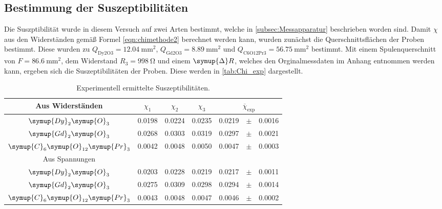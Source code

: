 \subsection{Bestimmung der Suszeptibilitäten}
\label{subsec:A_Suszep}
Die Suszptibilität wurde in diesem Versuch auf zwei Arten bestimmt, welche in \autoref{subsec:Messapparatur} beschrieben worden sind. Damit $\chi$ aus den Widerständen gemäß
Formel \eqref{eqn:chimethode2} berechnet werden kann, wurden zunächst die Querschnittsflächen der Proben bestimmt. Diese wurden zu 
$Q_{\text{Dy2O3}} = \qty{12.04}{\milli\metre\squared}$, $Q_{\text{Gd2O3}} = \qty{8.89}{\milli\metre\squared}$ und $Q_{\text{C6O12Pr3}} = \qty{56.75}{\milli\metre\squared}$
bestimmt. Mit einem Spulenquerschnitt von $F = \qty{86,6}{\milli\metre\squared}$, dem Widerstand $R_3 = \qty{998}{\ohm}$ und einem $\symup{\Delta}R$, welches den Orginalmessdaten 
im Anhang entnommen werden kann, ergeben sich die Suszeptibilitäten der Proben. Diese werden in \autoref{tab:Chi_exp} dargestellt.
\begin{table}
  \centering
  \caption{Experimentell ermittelte Suszeptibilitäten.}
  \label{tab:Chi_exp}
  \begin{tabular}{c S[table-format = 1.4] S S r c l}
    \toprule
      {Aus Widerständen} & {$\chi_1$} & {$\chi_2$} & {$\chi_3$} &
        \\
    \midrule
      {$\symup{Dy}_2\symup{O}_3$}                 & 0.0198 & 0.0224 & 0.0235 & 0.0219 & {$\pm$} & 0.0016 \\
      {$\symup{Gd}_2\symup{O}_3$}                 & 0.0268 & 0.0303 & 0.0319 & 0.0297 & {$\pm$} & 0.0021 \\
      {$\symup{C}_6\symup{O}_{12}\symup{Pr}_3$}   & 0.0042 & 0.0048 & 0.0050 & 0.0047 & {$\pm$} & 0.0003 \\
    \bottomrule
      {Aus Spannungen} & & & & & \\
    \bottomrule 
      {$\symup{Dy}_2\symup{O}_3$}                 & 0.0203 & 0.0228 & 0.0219 & 0.0217 & {$\pm$} & 0.0011 \\
      {$\symup{Gd}_2\symup{O}_3$}                 & 0.0275 & 0.0309 & 0.0298 & 0.0294 & {$\pm$} & 0.0014 \\
      {$\symup{C}_6\symup{O}_{12}\symup{Pr}_3$}   & 0.0043 & 0.0048 & 0.0047 & 0.0046 & {$\pm$} & 0.0002 \\
    \bottomrule 
  \end{tabular}
\end{table}

